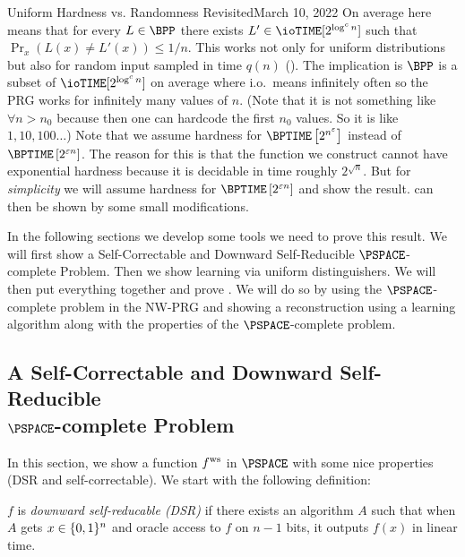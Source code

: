 \begin{lecture}{8}{Uniform Hardness vs. Randomness Revisited}{March 10, 2022}
On average here means that for every $L \in \BPP$ there exists $L' \in \ioTIME[2^{\log^c n}]$ such that $\Pr_x(L(x) \neq L'(x)) \leq 1/n$. This works not only for uniform distributions but also for random input sampled in time $q(n)$ ().
The implication is $\BPP$ is a subset of $\ioTIME[2^{\log^c n}]$ on average where i.o.\ means infinitely often so the PRG works for infinitely many values of $n$. (Note that it is not something like $\forall n > n_0$ because then one can hardcode the first $n_0$ values. So it is like $1,10,100 \ldots$)
Note that we assume hardness for $\BPTIME\left[2^{n^\eps}\right]$ instead of $\BPTIME\left[2^{\eps n}\right]$. The reason for this is that the function we construct cannot have exponential hardness because it is decidable in time roughly $2^{\sqrt{n}}$. But for \emph{simplicity} we will assume hardness for $\BPTIME\left[2^{\eps n}\right]$ and show the result.  can then be shown by some small modifications.

In the following sections we develop some tools we need to prove this result. We will first show a Self-Correctable and Downward Self-Reducible $\PSPACE$-complete Problem. Then we show learning via uniform distinguishers. We will then put everything together and prove . We will do so by using the $\PSPACE$-complete problem in the NW-PRG and showing a reconstruction using a learning algorithm along with the properties of the $\PSPACE$-complete problem.

\subsection[A Self-Correctable and Downward Self-Reducible \texorpdfstring{$\PSPACE$}{PSPACE}-complete Problem]
{A Self-Correctable and Downward Self-Reducible \\ \texorpdfstring{$\PSPACE$}{PSPACE}-complete Problem}

In this section, we show a function $ f^{\text{ws}} $ in $\PSPACE$ with some nice properties (DSR and self-correctable). We start with the following definition:
\begin{definition}
	$f$ is \emph{downward self-reducable (DSR)} if there exists an algorithm $A$
	such that when $A$ gets $x \in \{0, 1\}^n$ and oracle access to $f$ on $n -
	1$ bits, it outputs $f(x)$ in linear time.
\end{definition}


\end{lecture}
